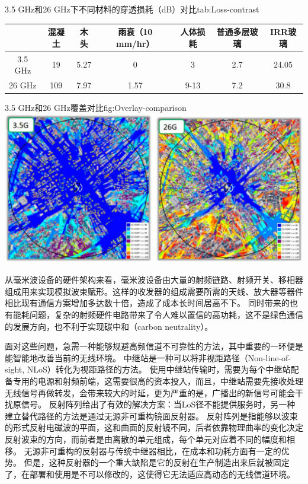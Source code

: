 \documentclass[supercite]{HustGraduPaper}
\begin{document}
\begin{generaltab}{3.5 GHz和26 GHz下不同材料的穿透损耗（dB）对比\cite{ZTE2020}}{tab:Loss-contrast}
	\begin{tabular}{ccccccc}
		\toprule
		        & 混凝土 &  木头  & 雨衰（10 mm/hr） & 人体损耗 & 普通多层玻璃 & IRR玻璃 \\ \midrule
		3.5 GHz & 19  & 5.27 &      0       &  3   &  2.7   & 24.05 \\
		26 GHz  & 109 & 7.97 &     1.57     & 9-13 &  7.2   & 30.8  \\ \bottomrule
	\end{tabular}
\end{generaltab}

\begin{generalfig}[htb]{3.5 GHz和26 GHz覆盖对比\cite{ZTE2020}}{fig:Overlay-comparison}
	\includegraphics[width=0.8\linewidth]{Figures/Overlay-comparison.JPG}
\end{generalfig}

从毫米波设备的硬件架构来看，毫米波设备由大量的射频链路、射频开关、移相器组成用来实现模拟波束赋形。这样的收发器的组成需要所需的天线、放大器等器件相比现有通信方案增加多达数十倍，造成了成本长时间居高不下。
同时带来的也有能耗问题，复杂的射频硬件电路带来了令人难以置信的高功耗，这不是绿色通信的发展方向，也不利于实现碳中和（carbon neutrality）。

面对这些问题，急需一种能够规避高频信道不可靠性的方法，其中重要的一环便是能智能地改善当前的无线环境。
中继站是一种可以将非视距路径（Non-line-of-sight, NLoS）转化为视距路径的方法\cite{Dohler2010a}。
使用中继站传输时，需要为每个中继站配备专用的电源和射频前端，这需要很高的资本投入，而且，中继站需要先接收处理无线信号再做转发，会带来较大的时延，更为严重的是，广播出的新信号可能会干扰原信号\cite{di2020reconfigurable}。
反射阵列给出了有效的解决方案：当LoS径不能提供服务时，另一种建立替代路径的方法是通过无源非可重构镜面反射器。
反射阵列是指能够以波束的形式反射电磁波的平面\cite{huang2005reflectarray}，这和曲面的反射镜不同，后者依靠物理曲率的变化决定反射波束的方向，而前者是由离散的单元组成，每个单元对应着不同的幅度和相移\cite{pozar1997design}。
无源非可重构的反射器与传统中继器相比，在成本和功耗方面有一定的优势。
但是，这种反射器的一个重大缺陷是它的反射在生产制造出来后就被固定了，在部署和使用是不可以修改的，这使得它无法适应高动态的无线信道环境。
\end{document}

